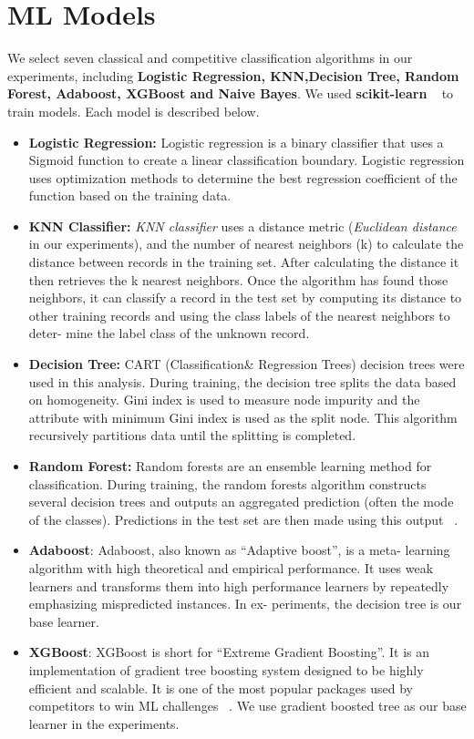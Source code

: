 \section{ML Models}

We select seven classical and competitive classification algorithms in our experiments, including \textbf{Logistic Regression, KNN,Decision Tree, Random Forest, Adaboost, XGBoost and Naive Bayes}.
We used \textbf{scikit-learn} ~\cite{Scikit-learn:2011} to train models. Each model is described
below.


\begin{itemize}
	\item { \textbf{Logistic Regression:}
	Logistic regression is a binary classifier that
	uses a Sigmoid function to create a linear classification boundary. Logistic regression uses optimization methods to determine
	the best regression coefficient of the function based on the training data. ~\cite{McFadden1973}
}

\item {
	\textbf{KNN Classifier:} \textit{KNN classifier} uses a distance metric (\textit{Euclidean
	distance} in our experiments), and the number of nearest neighbors
	(k) to calculate the distance between records in the training set.
	After calculating the distance it then retrieves the k nearest neighbors. Once the algorithm has found those neighbors, it can classify
	a record in the test set by computing its distance to other training
	records and using the class labels of the nearest neighbors to deter-
	mine the label class of the unknown record. ~\cite{HastieTibshirani}
}

\item {
\textbf{Decision Tree:} CART (Classification\& Regression Trees) decision trees were used in this analysis. During training, the decision
	tree splits the data based on homogeneity. Gini index is used to
	measure node impurity and the attribute with minimum Gini index
	is used as the split node. This algorithm recursively partitions data
	until the splitting is completed. ~\cite{Quinlan1986}
}
\item{
   \textbf{Random Forest:} Random forests are an ensemble learning method
	for classification. During training, the random forests algorithm
	constructs several decision trees and outputs an aggregated prediction (often the mode of the classes). Predictions in the test set are
	then made using this output ~\cite{CuiChen2015}.
}

\item {
	\textbf{Adaboost}: Adaboost, also known as “Adaptive boost”, is a meta-
	learning algorithm with high theoretical and empirical performance.
	It uses weak learners and transforms them into high performance
	learners by repeatedly emphasizing mispredicted instances. In ex-
	periments, the decision tree is our base learner. ~\cite{Hastie2009}
}
\item {
	\textbf{XGBoost}: XGBoost is short for “Extreme Gradient Boosting”. It is
	an implementation of gradient tree boosting system designed to be
	highly efficient and scalable. It is one of the most popular packages
	used by competitors to win ML challenges ~\cite{Guestrin2016}. We use gradient
	boosted tree as our base learner in the experiments.
}


\end{itemize}
